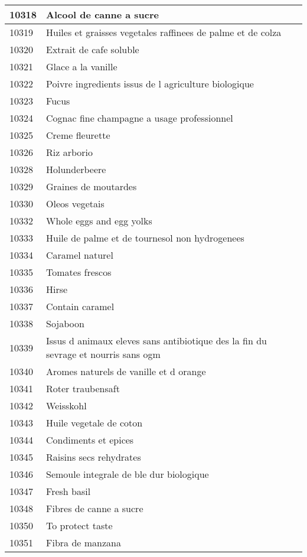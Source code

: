 \begin{longtable}{|l|l|}
10318 & Alcool de canne a sucre \\ \hline 
10319 & Huiles et graisses vegetales raffinees de palme et de colza \\ \hline 
10320 & Extrait de cafe soluble \\ \hline 
10321 & Glace a la vanille \\ \hline 
10322 & Poivre ingredients issus de l agriculture biologique \\ \hline 
10323 & Fucus \\ \hline 
10324 & Cognac fine champagne a usage professionnel \\ \hline 
10325 & Creme fleurette \\ \hline 
10326 & Riz arborio \\ \hline 
10328 & Holunderbeere \\ \hline 
10329 & Graines de moutardes \\ \hline 
10330 & Oleos vegetais \\ \hline 
10332 & Whole eggs and egg yolks \\ \hline 
10333 & Huile de palme et de tournesol non hydrogenees \\ \hline 
10334 & Caramel naturel \\ \hline 
10335 & Tomates frescos \\ \hline 
10336 & Hirse \\ \hline 
10337 & Contain caramel \\ \hline 
10338 & Sojaboon \\ \hline 
10339 & Issus d animaux eleves sans antibiotique des la fin du sevrage et nourris sans ogm \\ \hline 
10340 & Aromes naturels de vanille et d orange \\ \hline 
10341 & Roter traubensaft \\ \hline 
10342 & Weisskohl \\ \hline 
10343 & Huile vegetale de coton \\ \hline 
10344 & Condiments et epices \\ \hline 
10345 & Raisins secs rehydrates \\ \hline 
10346 & Semoule integrale de ble dur biologique \\ \hline 
10347 & Fresh basil \\ \hline 
10348 & Fibres de canne a sucre \\ \hline 
10350 & To protect taste \\ \hline 
10351 & Fibra de manzana \\ \hline 

\end{longtable}
